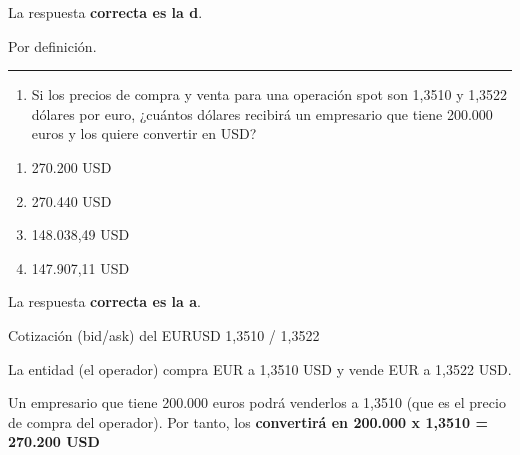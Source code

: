 \documentclass[
  letterpaper,
  DIV=11,
  numbers=noendperiod]{scrreprt}
\providecommand{\tightlist}{%
  \setlength{\itemsep}{0pt}\setlength{\parskip}{0pt}}\usepackage{longtable,booktabs,array}
\begin{document}
\begin{tcolorbox}[enhanced jigsaw, left=2mm, opacityback=0, colback=white, breakable, arc=.35mm, bottomrule=.15mm, rightrule=.15mm, toprule=.15mm, leftrule=.75mm, colframe=quarto-callout-tip-color-frame]
\begin{minipage}[t]{5.5mm}
\textcolor{quarto-callout-tip-color}{\faLightbulb}
\end{minipage}%
\begin{minipage}[t]{\textwidth - 5.5mm}

La respuesta \textbf{correcta es la d}.

Por definición.

\end{minipage}%
\end{tcolorbox}

\begin{center}\rule{0.5\linewidth}{0.5pt}\end{center}

\begin{enumerate}
\def\labelenumi{\arabic{enumi}.}
\setcounter{enumi}{44}
\tightlist
\item
  Si los precios de compra y venta para una operación spot son 1,3510 y
  1,3522 dólares por euro, ¿cuántos dólares recibirá un empresario que
  tiene 200.000 euros y los quiere convertir en USD?
\end{enumerate}

\begin{enumerate}
\def\labelenumi{\alph{enumi}.}
\item
  270.200 USD
\item
  270.440 USD
\item
  148.038,49 USD
\item
  147.907,11 USD
\end{enumerate}

\begin{tcolorbox}[enhanced jigsaw, left=2mm, opacityback=0, colback=white, breakable, arc=.35mm, bottomrule=.15mm, rightrule=.15mm, toprule=.15mm, leftrule=.75mm, colframe=quarto-callout-tip-color-frame]
\begin{minipage}[t]{5.5mm}
\textcolor{quarto-callout-tip-color}{\faLightbulb}
\end{minipage}%
\begin{minipage}[t]{\textwidth - 5.5mm}

La respuesta \textbf{correcta es la a}.

Cotización (bid/ask) del EURUSD 1,3510 / 1,3522

La entidad (el operador) compra EUR a 1,3510 USD y vende EUR a 1,3522
USD.

Un empresario que tiene 200.000 euros podrá venderlos a 1,3510 (que es
el precio de compra del operador). Por tanto, los \textbf{convertirá en
200.000 x 1,3510 = 270.200 USD}

\end{minipage}%
\end{tcolorbox}
\end{document}
